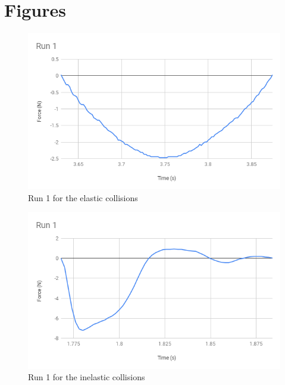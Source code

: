 \section{Figures}
\begin{figure}[ht]
    \centering
    \includegraphics[scale=0.71]{image/08-impulse/Run1-elastic.png}
    \caption{Run 1 for the elastic collisions}
    \label{figure.08.run.1.elastic}
\end{figure}
\begin{figure}[ht]
    \centering
    \includegraphics[scale=0.71]{image/08-impulse/Run1-inelastic.png}
    \caption{Run 1 for the inelastic collisions}
    \label{figure.08.run.1}
\end{figure}
